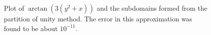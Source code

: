 \begin{figure}
\centering
{}
\caption{Plot of $\arctan(3(y^2+x))$ and the subdomains formed from the partition of unity method. The error in this approximation was found to be about $10^{-11}$.}
\label{star_plot}
\end{figure}


